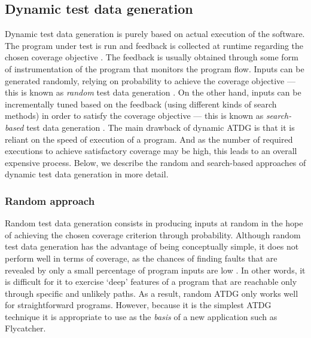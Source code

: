 \subsection{Dynamic test data generation}

Dynamic test data generation is purely based on actual execution of the software. The program under test is run and feedback is collected at runtime regarding the chosen coverage objective \cite{edvardsson1999survey}. The feedback is usually obtained through some form of instrumentation of the program that monitors the program flow. Inputs can be generated randomly, relying on probability to achieve the coverage objective --- this is known as \emph{random} test data generation \cite{edvardsson1999survey}. On the other hand, inputs can be incrementally tuned based on the feedback (using different kinds of search methods) in order to satisfy the coverage objective --- this is known as \emph{search-based} test data generation \cite{mcminn2004search}. The main drawback of dynamic ATDG is that it is reliant on the speed of execution of a program. And as the number of required executions to achieve satisfactory coverage may be high, this leads to an overall expensive process. Below, we describe the random and search-based approaches of dynamic test data generation in more detail.


\subsubsection{Random approach}

Random test data generation consists in producing inputs at random in the hope of achieving the chosen coverage criterion through probability. Although random test data generation has the advantage of being conceptually simple, it does not perform well in terms of coverage, as the chances of finding faults that are revealed by only a small percentage of program inputs are low \cite{edvardsson1999survey}. In other words, it is difficult for it to exercise `deep' features of a program that are reachable only through specific and unlikely paths. As a result, random ATDG only works well for straightforward programs. However, because it is the simplest ATDG technique it is appropriate to use as the \emph{basis} of a new application such as \textsf{Flycatcher}.

